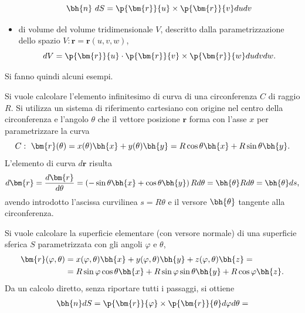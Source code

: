 \begin{remark}
\begin{itemize}
 \begin{equation}
  \bh{n} \ dS = \p{\bm{r}}{u} \times \p{\bm{r}}{v} du dv
 \end{equation}
\item di volume del volume tridimensionale $V$, descritto dalla parametrizzazione dello spazio $V: \bm{r} = \bm{r}(u,v,w)$,
\begin{equation}
 dV = \p{\bm{r}}{u} \cdot  \p{\bm{r}}{v} \times \p{\bm{r}}{w} du dv dw .
\end{equation}
\end{itemize} 
Si fanno quindi alcuni esempi. 
\begin{example}\label{exa:pol:line}
Si vuole calcolare l'elemento infinitesimo di curva di una circonferenza $C$ di raggio $R$. Si utilizza un sistema di riferimento cartesiano con origine nel centro della circonferenza e l'angolo $\theta$ che il vettore posizione $\bm{r}$ forma con l'asse $x$ per parametrizzare la curva
\begin{equation}
  C : \ \bm{r}(\theta) = x(\theta) \bh{x} + y(\theta) \bh{y} = R \cos \theta \bh{x} + R \sin \theta \bh{y} .
\end{equation}
L'elemento di curva $d \bm{r}$ risulta
\begin{equation}
 d\bm{r} = \dfrac{d\bm{r}}{d \theta} = \left( -\sin \theta \bh{x} + \cos \theta \bh{y} \right) R d \theta = \bh{\theta} R d\theta = \bh{\theta} ds ,
\end{equation}
avendo introdotto l'ascissa curvilinea $s = R \theta$ e il versore $\bh{\theta}$ tangente alla circonferenza.
\end{example}
\begin{example}\label{exa:cyl:surf}
Si vuole calcolare la superficie elementare (con versore normale) di una superficie sferica $S$ parametrizzata con gli angoli $\varphi$ e $\theta$,
\begin{equation}
\begin{aligned}
 \bm{r}(\varphi,\theta) & = 
 x(\varphi,\theta) \bh{x} + y(\varphi,\theta) \bh{y} + z(\varphi,\theta) \bh{z} = \\
& = R \sin \varphi \cos \theta \bh{x} +
    R \sin \varphi \sin \theta \bh{y} +
    R \cos \varphi \bh{z} .
\end{aligned}
\end{equation}
Da un calcolo diretto, senza riportare tutti i passaggi, si ottiene
\begin{equation}
\begin{aligned}
 \bh{n} dS & = \p{\bm{r}}{\varphi} \times \p{\bm{r}}{\theta} d\varphi d\theta = \\

\end{aligned}
\end{equation}
\end{example}
\end{remark}
